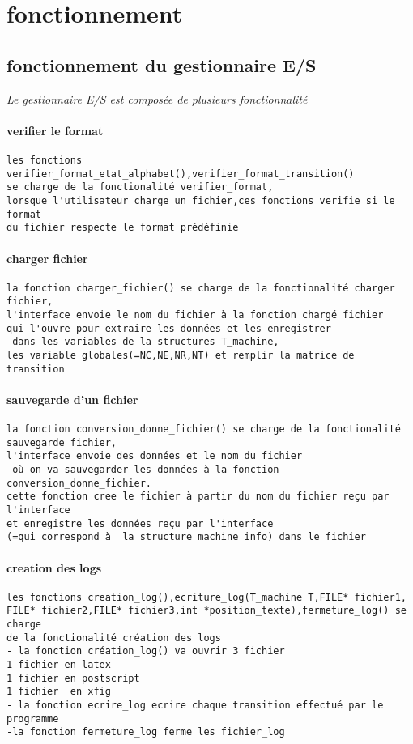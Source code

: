 \documentclass{article}
\begin{document}
\section{fonctionnement}

\subsection{fonctionnement du gestionnaire E/S}

\textit{Le gestionnaire E/S est composée de plusieurs fonctionnalité}

\paragraph{verifier le format}
\begin{verbatim}
les fonctions verifier_format_etat_alphabet(),verifier_format_transition()
se charge de la fonctionalité verifier_format,
lorsque l'utilisateur charge un fichier,ces fonctions verifie si le format 
du fichier respecte le format prédéfinie 
\end{verbatim}

\paragraph{charger fichier}
\begin{verbatim}
la fonction charger_fichier() se charge de la fonctionalité charger fichier,
l'interface envoie le nom du fichier à la fonction chargé fichier
qui l'ouvre pour extraire les données et les enregistrer 
 dans les variables de la structures T_machine,
les variable globales(=NC,NE,NR,NT) et remplir la matrice de transition
\end{verbatim}

\paragraph{sauvegarde d'un fichier}
\begin{verbatim}
la fonction conversion_donne_fichier() se charge de la fonctionalité 
sauvegarde fichier,
l'interface envoie des données et le nom du fichier
 où on va sauvegarder les données à la fonction conversion_donne_fichier.
cette fonction cree le fichier à partir du nom du fichier reçu par l'interface 
et enregistre les données reçu par l'interface
(=qui correspond à  la structure machine_info) dans le fichier
\end{verbatim}
\paragraph{creation des logs}
\begin{verbatim}
les fonctions creation_log(),ecriture_log(T_machine T,FILE* fichier1,
FILE* fichier2,FILE* fichier3,int *position_texte),fermeture_log() se charge
de la fonctionalité création des logs
- la fonction création_log() va ouvrir 3 fichier
1 fichier en latex
1 fichier en postscript
1 fichier  en xfig
- la fonction ecrire_log ecrire chaque transition effectué par le programme
-la fonction fermeture_log ferme les fichier_log

\end{verbatim}
\newpage
\end{document}
